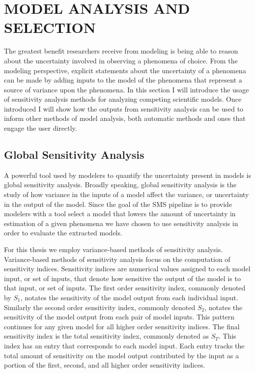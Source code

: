 \chapter{MODEL ANALYSIS AND SELECTION\label{chapter:analysis}}
The greatest benefit researchers receive from modeling is being able to reason about the uncertainty involved in observing a phenomena of choice.
From the modeling perspective, explicit statements about the uncertainty of a phenomena can be made by adding inputs to the model of the phenomena that represent a source of variance upon the phenomena.
In this section I will introduce the usage of sensitivity analysis methods for analyzing competing scientific models.
Once introduced I will show how the outputs from sensitivity analysis can be used to inform other methods of model analysis, both automatic methods and ones that engage the user directly.

\section{Global Sensitivity Analysis\label{sec:sens_analysis}}
A powerful tool used by modelers to quantify the uncertainty present in models is global sensitivity analysis. Broadly speaking, global sensitivity analysis is the study of how variance in the inputs of a model affect the variance, or uncertainty in the output of the model. Since the goal of the SMS pipeline is to provide modelers with a tool select a model that lowers the amount of uncertainty in estimation of a given phenomena we have chosen to use sensitivity analysis in order to evaluate the extracted models.

For this thesis we employ variance-based methods of sensitivity analysis.
Variance-based methods of sensitivity analysis focus on the computation of sensitivity indices. Sensitivity indices are numerical values assigned to each model input, or set of inputs, that denote how sensitive the output of the model is to that input, or set of inputs. The first order sensitivity index, commonly denoted by $S_1$, notates the sensitivity of the model output from each individual input. Similarly the second order sensitivity index, commonly denoted $S_2$, notates the sensitivity of the model output from each pair of model inputs. This pattern continues for any given model for all higher order sensitivity indices.
The final sensitivity index is the total sensitivity index, commonly denoted as $S_T$. This index has an entry that corresponds to each model input. Each entry tracks the total amount of sensitivity on the model output contributed by the input as a portion of the first, second, and all higher order sensitivity indices.

